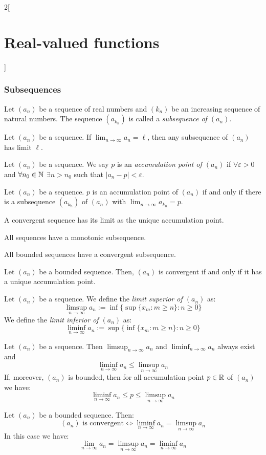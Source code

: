 \documentclass[../../../main.tex]{subfiles}
\begin{document}
\begin{multicols}{2}[\section{Real-valued functions}]
  \subsubsection{Subsequences}
  \begin{definition}[Subsequence]
    Let $(a_n)$ be a sequence of real numbers and $(k_n)$ be an increasing sequence of natural numbers. The sequence $(a_{k_n})$ is called a \textit{subsequence of $(a_n)$}.
  \end{definition}
  \begin{lemma}
    Let $(a_n)$ be a sequence. If $\displaystyle\lim_{n\to\infty} a_n=\ell$, then any subsequence of $(a_n)$ has limit $\ell$.
  \end{lemma}
  \begin{definition}
    Let $(a_n)$ be a sequence. We say $p$ is an \textit{accumulation point of $(a_n)$} if $\forall\varepsilon>0$ and $\forall n_0\in\mathbb{N}$ $\exists n>n_0$ such that $|a_n-p|<\varepsilon$.
  \end{definition}
  \begin{prop}
    Let $(a_n)$ be a sequence. $p$ is an accumulation point of $(a_n)$ if and only if there is a subsequence $(a_{k_n})$ of $(a_n)$ with $\displaystyle\lim_{n\to\infty}a_{k_n}=p$.
  \end{prop}
  \begin{corollary}
    A convergent sequence has its limit as the unique accumulation point.
  \end{corollary}
  \begin{prop}
    All sequences have a monotonic subsequence.
  \end{prop}
  \begin{theorem}
    All bounded sequences have a convergent subsequence.
  \end{theorem}
  \begin{prop}
    Let $(a_n)$ be a bounded sequence. Then, $(a_n)$ is convergent if and only if it has a unique accumulation point.
  \end{prop}
  \begin{definition}
    Let $(a_n)$ be a sequence. We define the \textit{limit superior of $(a_n)$} as:
    $$\limsup_{n\to\infty}a_n:=\inf\{\sup\{x_m:m\geq n\}:n\geq 0\}$$
    We define the \textit{limit inferior of $(a_n)$} as:
    $$\liminf_{n\to\infty}a_n:=\sup\{\inf\{x_m:m\geq n\}:n\geq 0\}$$
  \end{definition}
  \begin{prop}
    Let $(a_n)$ be a sequence. Then $\displaystyle\limsup_{n\to\infty}a_n$ and $\displaystyle\liminf_{n\to\infty}a_n$ always exist and $$\liminf_{n\to\infty}a_n\leq\limsup_{n\to\infty}a_n$$
    If, moreover, $(a_n)$ is bounded, then for all accumulation point $p\in\mathbb{R}$ of $(a_n)$ we have:
    $$\liminf_{n\to\infty}a_n\leq p\leq\limsup_{n\to\infty}a_n$$
  \end{prop}
  \begin{prop}
    Let $(a_n)$ be a bounded sequence. Then: $$(a_n)\text{ is convergent}\iff \liminf_{n\to\infty} a_n=\limsup_{n\to\infty} a_n$$ In this case we have: $$\lim_{n\to\infty} a_n=\limsup_{n\to\infty} a_n=\liminf_{n\to\infty} a_n$$
  \end{prop}

\end{multicols}
\end{document}
